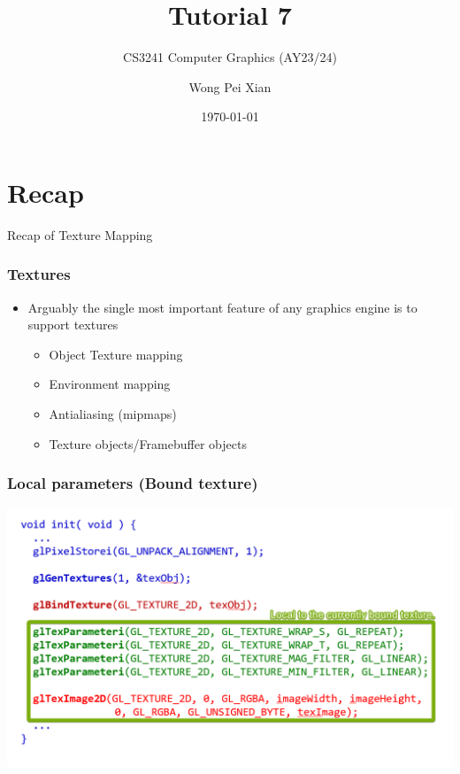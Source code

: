 \documentclass{beamer}
\title{Tutorial 7}
\subtitle{CS3241 Computer Graphics (AY23/24)}
\date{\today}
\author{Wong Pei Xian}
\institute[]{\email{e0389023@u.nus.edu}}
\begin{document}
\frame[plain]{\titlepage}

\section{Recap}

\begin{frame}
    \AlegreyaExtraBold \LARGE
    Recap of Texture Mapping
\end{frame}

\begin{frame}
    \frametitle{Textures}

    \begin{itemize}
        \item Arguably the single most important feature of any graphics engine is to support textures
        \begin{itemize}
            \item Object Texture mapping
            \item Environment mapping
            \item Antialiasing (mipmaps)
            \item Texture objects/Framebuffer objects
        \end{itemize}
    \end{itemize}

\end{frame}

\begin{frame}
    \frametitle{Local parameters (Bound texture)}

    \begin{center}
        \includegraphics[scale=0.5]{local-bound-texture.png}
    \end{center}

\end{frame}
\end{document}
